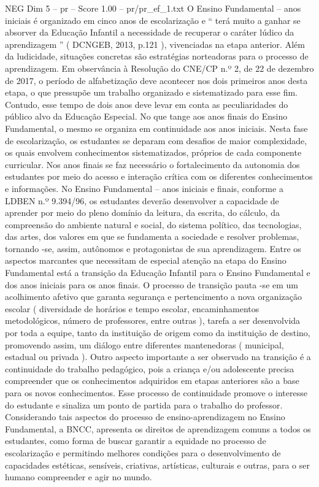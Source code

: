 \begin{textsample}{NEG Dim 5 – pr – Score 1.00 – pr/pr\_ef\_1.txt}
O Ensino Fundamental – anos iniciais é organizado em cinco anos de escolarização e “ terá muito a ganhar se absorver da Educação Infantil a necessidade de recuperar o caráter lúdico da aprendizagem ” ( DCNGEB, 2013, p.121 ), vivenciadas na etapa anterior.
Além da ludicidade, situações concretas são estratégias norteadoras para o processo de aprendizagem.
Em observância à Resolução do CNE/CP n.º 2, de 22 de dezembro de 2017, o período de alfabetização deve acontecer nos dois primeiros anos desta etapa, o que pressupõe um trabalho organizado e sistematizado para esse fim.
Contudo, esse tempo de dois anos deve levar em conta as peculiaridades do público alvo da Educação Especial.
No que tange aos anos finais do Ensino Fundamental, o mesmo se organiza em continuidade aos anos iniciais.
Nesta fase de escolarização, os estudantes se deparam com desafios de maior complexidade, os quais envolvem conhecimentos sistematizados, próprios de cada componente curricular.
Nos anos finais se faz necessário o fortalecimento da autonomia dos estudantes por meio do acesso e interação crítica com os diferentes conhecimentos e informações.
No Ensino Fundamental – anos iniciais e finais, conforme a LDBEN n.º 9.394/96, os estudantes deverão desenvolver a capacidade de aprender por meio do pleno domínio da leitura, da escrita, do cálculo, da compreensão do ambiente natural e social, do sistema político, das tecnologias, das artes, dos valores em que se fundamenta a sociedade e resolver problemas, tornando -se, assim, autônomos e protagonistas de sua aprendizagem.
Entre os aspectos marcantes que necessitam de especial atenção na etapa do Ensino Fundamental está a transição da Educação Infantil para o Ensino Fundamental e dos anos iniciais para os anos finais.
O processo de transição pauta -se em um acolhimento afetivo que garanta segurança e pertencimento a nova organização escolar ( diversidade de horários e tempo escolar, encaminhamentos metodológicos, número de professores, entre outras ), tarefa a ser desenvolvida por toda a equipe, tanto da instituição de origem como da instituição de destino, promovendo assim, um diálogo entre diferentes mantenedoras ( municipal, estadual ou privada ).
Outro aspecto importante a ser observado na transição é a continuidade do trabalho pedagógico, pois a criança e/ou adolescente precisa compreender que os conhecimentos adquiridos em etapas anteriores são a base para os novos conhecimentos.
Esse processo de continuidade promove o interesse do estudante e sinaliza um ponto de partida para o trabalho do professor.
Considerando tais aspectos do processo de ensino-aprendizagem no Ensino Fundamental, a BNCC, apresenta os direitos de aprendizagem comuns a todos os estudantes, como forma de buscar garantir a equidade no processo de escolarização e permitindo melhores condições para o desenvolvimento de capacidades estéticas, sensíveis, criativas, artísticas, culturais e outras, para o ser humano compreender e agir no mundo.

\end{textsample}
